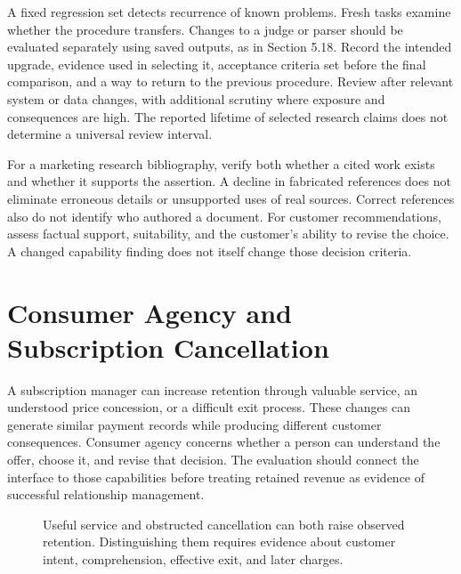 A fixed regression set detects recurrence of known problems. Fresh tasks
examine whether the procedure transfers. Changes to a judge or parser
should be evaluated separately using saved outputs, as in Section 5.18.
Record the intended upgrade, evidence used in selecting it, acceptance
criteria set before the final comparison, and a way to return to the
previous procedure. Review after relevant system or data changes, with
additional scrutiny where exposure and consequences are high. The
reported lifetime of selected research claims does not determine a
universal review interval.

For a marketing research bibliography, verify both whether a cited work
exists and whether it supports the assertion. A decline in fabricated
references does not eliminate erroneous details or unsupported uses of
real sources. Correct references also do not identify who authored a
document. For customer recommendations, assess factual support,
suitability, and the customer's ability to revise the choice. A changed
capability finding does not itself change those decision criteria.

\hypertarget{M08-consumer-agency-and-subscription-cancellation}{%
\section{Consumer Agency and Subscription
Cancellation}\label{M08-consumer-agency-and-subscription-cancellation}}

\noindent \noindent A subscription manager can increase retention through valuable
service, an understood price concession, or a difficult exit process.
These changes can generate similar payment records while producing
different customer consequences. Consumer agency concerns whether a
person can understand the offer, choose it, and revise that decision.
The evaluation should connect the interface to those capabilities before
treating retained revenue as evidence of successful relationship
management.

\begin{figure}[htbp]
\centering

\caption{Useful service and obstructed cancellation can both raise observed retention. Distinguishing them requires evidence about customer intent, comprehension, effective exit, and later charges.}\label{fig:M08_agency_outcomes}
\end{figure}

